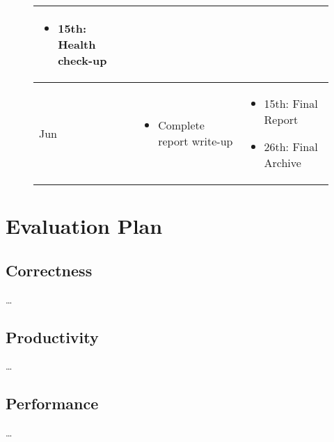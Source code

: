 \documentclass[12pt,twoside]{report}
\begin{document}
\begin{figure}
\begin{tabular}{l|p{}|p{}}
\begin{itemize}
\item 15th: Health check-up
\end{itemize}\\
\hline
Jun & \begin{itemize}
\item Complete report write-up
\end{itemize} & \begin{itemize}
\item 15th: Final Report
\item 26th: Final Archive
\end{itemize}
\end{tabular}
\label{table:timetable}
\end{figure}


\chapter{Evaluation Plan}

\section{Correctness} \dots


\section{Productivity} \dots


\section{Performance} \dots


\clearpage



\end{document}
